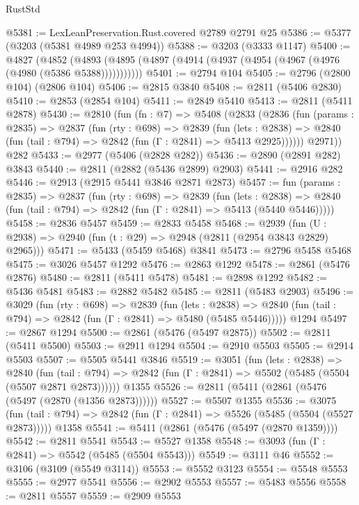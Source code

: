\begin{lexlean}{RustStd}
\begin{coremodule}
{\begin{coremodule}
{{{{{{{{{{{{{{{@5381 := LexLeanPreservation.Rust.covered @2789 @2791 @25
@5386 := @5377 (@3203 (@5381 @4989 @253 @4994))
@5388 := @3203 (@3333 @1147)
@5400 := @4827
    (@4852 (@4893 (@4895 (@4897 (@4914 (@4937 (@4954 (@4967 (@4976 (@4980 (@5386 @5388)))))))))))
@5401 := @2794 @104
@5405 := @2796 (@2800 @104) (@2806 @104)
@5406 := @2815 @3840
@5408 := @2811 (@5406 @2830)
@5410 := @2853 (@2854 @104)
@5411 := @2849 @5410
@5413 := @2811 (@5411 @2878)
@5430 := @2810
    (fun (fn : @7) =>
    @5408
      (@2833
        (@2836
          (fun (params : @2835) =>
          @2837
            (fun (rty : @698) =>
            @2839
              (fun (lets : @2838) =>
              @2840 (fun (tail : @794) => @2842 (fun (Γ : @2841) => @5413 @2925))))))
        @2971))
    @282
@5433 := @2977 (@5406 (@2828 @282))
@5436 := @2890 (@2891 @282) @3843
@5440 := @2811 (@2882 (@5436 @2899) @2903)
@5441 := @2916 @282
@5446 := @2913 (@2915 @5441 @3846 @2871 @2873)
@5457 := fun (params : @2835) =>
  @2837
    (fun (rty : @698) =>
    @2839
      (fun (lets : @2838) =>
      @2840 (fun (tail : @794) => @2842 (fun (Γ : @2841) => @5413 (@5440 @5446)))))
@5458 := @2836 @5457
@5459 := @2833 @5458
@5468 := @2939 (fun (U : @2938) => @2940 (fun (t : @29) => @2948 (@2811 (@2954 @3843 @2829) @2965)))
@5471 := @5433 (@5459 @5468) @3841
@5473 := @2796 @5458 @5468
@5475 := @3026 @5457 @1292
@5476 := @2863 @1292
@5478 := @2861 (@5476 @2876)
@5480 := @2811 (@5411 @5478)
@5481 := @2898 @1292
@5482 := @5436 @5481
@5483 := @2882 @5482
@5485 := @2811 (@5483 @2903)
@5496 := @3029
    (fun (rty : @698) =>
    @2839
      (fun (lets : @2838) =>
      @2840 (fun (tail : @794) => @2842 (fun (Γ : @2841) => @5480 (@5485 @5446)))))
    @1294
@5497 := @2867 @1294
@5500 := @2861 (@5476 (@5497 @2875))
@5502 := @2811 (@5411 @5500)
@5503 := @2911 @1294
@5504 := @2910 @5503
@5505 := @2914 @5503
@5507 := @5505 @5441 @3846
@5519 := @3051
    (fun (lets : @2838) =>
    @2840
      (fun (tail : @794) => @2842 (fun (Γ : @2841) => @5502 (@5485 (@5504 (@5507 @2871 @2873))))))
    @1355
@5526 := @2811 (@5411 (@2861 (@5476 (@5497 (@2870 (@1356 @2873))))))
@5527 := @5507 @1355
@5536 := @3075
    (fun (tail : @794) => @2842 (fun (Γ : @2841) => @5526 (@5485 (@5504 (@5527 @2873)))))
    @1358
@5541 := @5411 (@2861 (@5476 (@5497 (@2870 @1359))))
@5542 := @2811 @5541
@5543 := @5527 @1358
@5548 := @3093 (fun (Γ : @2841) => @5542 (@5485 (@5504 @5543)))
@5549 := @3111 @46
@5552 := @3106 (@3109 (@5549 @3114))
@5553 := @5552 @3123
@5554 := @5548 @5553
@5555 := @2977 @5541
@5556 := @2902 @5553
@5557 := @5483 @5556
@5558 := @2811 @5557
@5559 := @2909 @5553
}}}}}}}}}}}}}}}
\end{coremodule}}
\end{coremodule}
\end{lexlean}
